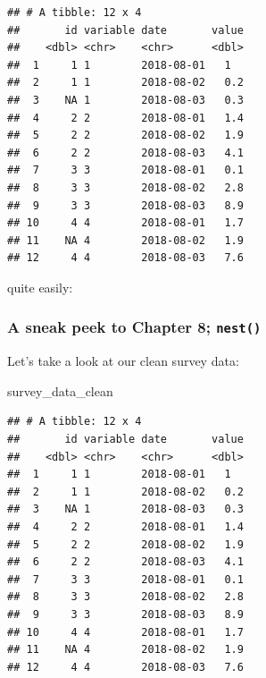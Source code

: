 \documentclass[]{gitbook}
\newenvironment{Shaded}{\begin{snugshade}}{\end{snugshade}}
\newcommand{\DataTypeTok}[1]{\textcolor[rgb]{0.13,0.29,0.53}{#1}}
\newcommand{\DecValTok}[1]{\textcolor[rgb]{0.00,0.00,0.81}{#1}}
\newcommand{\KeywordTok}[1]{\textcolor[rgb]{0.13,0.29,0.53}{\textbf{#1}}}
\newcommand{\NormalTok}[1]{#1}
\newcommand{\OperatorTok}[1]{\textcolor[rgb]{0.81,0.36,0.00}{\textbf{#1}}}
\newcommand{\OtherTok}[1]{\textcolor[rgb]{0.56,0.35,0.01}{#1}}
\newcommand{\StringTok}[1]{\textcolor[rgb]{0.31,0.60,0.02}{#1}}
\begin{document}
\begin{verbatim}
## # A tibble: 12 x 4
##       id variable date       value
##    <dbl> <chr>    <chr>      <dbl>
##  1     1 1        2018-08-01   1  
##  2     1 1        2018-08-02   0.2
##  3    NA 1        2018-08-03   0.3
##  4     2 2        2018-08-01   1.4
##  5     2 2        2018-08-02   1.9
##  6     2 2        2018-08-03   4.1
##  7     3 3        2018-08-01   0.1
##  8     3 3        2018-08-02   2.8
##  9     3 3        2018-08-03   8.9
## 10     4 4        2018-08-01   1.7
## 11    NA 4        2018-08-02   1.9
## 12     4 4        2018-08-03   7.6
\end{verbatim}

quite easily:

\begin{Shaded}
\end{Shaded}

\hypertarget{a-sneak-peek-to-chapter-8-nest}{%
\subsubsection{\texorpdfstring{A sneak peek to Chapter 8; \texttt{nest()}}{A sneak peek to Chapter 8; nest()}}\label{a-sneak-peek-to-chapter-8-nest}}

Let's take a look at our clean survey data:

\begin{Shaded}
\begin{Highlighting}[]
\NormalTok{survey_data_clean}
\end{Highlighting}
\end{Shaded}

\begin{verbatim}
## # A tibble: 12 x 4
##       id variable date       value
##    <dbl> <chr>    <chr>      <dbl>
##  1     1 1        2018-08-01   1  
##  2     1 1        2018-08-02   0.2
##  3    NA 1        2018-08-03   0.3
##  4     2 2        2018-08-01   1.4
##  5     2 2        2018-08-02   1.9
##  6     2 2        2018-08-03   4.1
##  7     3 3        2018-08-01   0.1
##  8     3 3        2018-08-02   2.8
##  9     3 3        2018-08-03   8.9
## 10     4 4        2018-08-01   1.7
## 11    NA 4        2018-08-02   1.9
## 12     4 4        2018-08-03   7.6
\end{verbatim}
\end{document}
